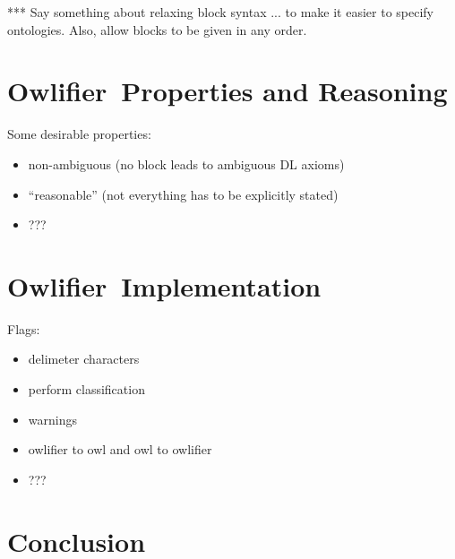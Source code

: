 \documentclass[preprint,number]{elsarticle}
\newcommand{\owlifier}{\textsf{Owlifier}}
\begin{document}
*** Say something about relaxing block syntax ... to make it easier to
specify ontologies. Also, allow blocks to be given in any order.


\section{\owlifier\ Properties and Reasoning}
\label{sec:properties}


Some desirable properties: 
\begin{itemize}
\item non-ambiguous (no block leads to ambiguous DL axioms)
\item ``reasonable'' (not everything has to be explicitly stated)
\item ???
\end{itemize}

\section{\owlifier\ Implementation}
\label{sec:implementation}

Flags: 
\begin{itemize}
\item delimeter characters 
\item perform classification
\item warnings
\item owlifier to owl and owl to owlifier
\item ??? 
\end{itemize}


\section{Conclusion}
\label{sec:conclusion}



%


\end{document}
